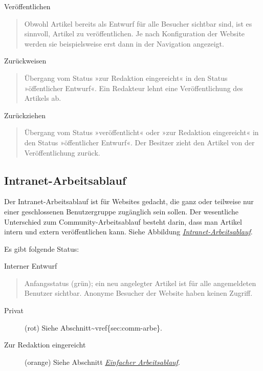 \documentclass[a4paper,12pt,ngerman]{manual}
\begin{document}
Veröffentlichen
\begin{quote}

Obwohl Artikel bereits als Entwurf für alle Besucher sichtbar sind,
ist es sinnvoll, Artikel zu veröffentlichen. Je nach Konfiguration
der Website werden sie beispielsweise erst dann in der Navigation
angezeigt.
\end{quote}

Zurückweisen
\begin{quote}

Übergang vom Status »zur Redaktion eingereicht« in den
Status »öffentlicher Entwurf«. Ein Redakteur lehnt eine Veröffentlichung
des Artikels ab.
\end{quote}

Zurückziehen
\begin{quote}

Übergang vom Status »veröffentlicht« oder »zur Redaktion
eingereicht« in den Status »öffentlicher Entwurf«. Der Besitzer
zieht den Artikel von der Veröffentlichung zurück.
\end{quote}
\hypertarget{sec-intr-arbe}{}

\subsection{Intranet-Arbeitsablauf}

Der Intranet-Arbeitsablauf ist für Websites gedacht, die ganz oder teilweise
nur einer geschlossenen Benutzergruppe zugänglich sein sollen. Der wesentliche
Unterschied zum Community-Arbeitsablauf besteht darin, dass man Artikel
intern und extern veröffentlichen kann. Siehe
Abbildung \hyperlink{fig-workflow-intranet}{\emph{Intranet-Arbeitsablauf}}.

Es gibt folgende Status:

Interner Entwurf
\begin{quote}

Anfangsstatus (grün); ein neu angelegter Artikel ist
für alle angemeldeten Benutzer sichtbar. Anonyme Besucher der Website haben
keinen Zugriff.
\end{quote}
\begin{description}
\item[Privat] \leavevmode
(rot) Siehe Abschnitt\textasciitilde{}vref\{sec:comm-arbe\}.

\item[Zur Redaktion eingereicht] \leavevmode
(orange) Siehe Abschnitt \hyperlink{sec-einf-publ}{\emph{Einfacher Arbeitsablauf}}.

\end{description}
\end{document}

